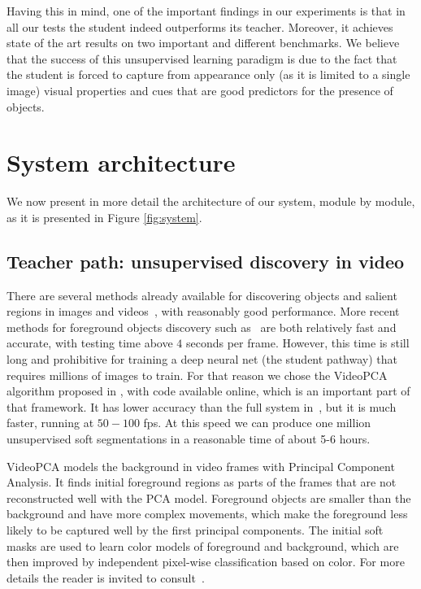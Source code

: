 \documentclass[10pt,twocolumn,letterpaper]{article}
\begin{document}
Having this in mind, one of the important findings in our experiments is that in all our tests
the student indeed outperforms its teacher. Moreover, it achieves state of the art results on two important and different benchmarks. We believe that the success of this unsupervised learning paradigm is due to the fact that the student is forced to capture from appearance only (as it is limited to a single image) visual properties and cues that are good predictors for the presence of objects.

\section{System architecture}

We now present in more detail the architecture of our system, module by module, as it is presented in Figure \ref{fig:system}.

\subsection{Teacher path: unsupervised discovery in video}

There are several methods already
available for discovering objects and salient regions in images and videos~\cite{borji2012salient,cheng2015global,hou2007saliency, jiang2013salient,cucchiara2003detecting,barnich2011vibe},
with reasonably good performance. More recent methods for foreground objects discovery such as~\cite{papazoglou2013fast,stretcu2015multiple} are both relatively fast and accurate, with testing time above $4$ seconds per frame. However, this time is still long and prohibitive for training a deep neural net (the student pathway) that requires millions of images to train. For that reason we chose the VideoPCA algorithm proposed in \cite{stretcu2015multiple}, with code available online, which is an important part of that 
framework. It has lower accuracy than the full system in~\cite{stretcu2015multiple}, but it is much faster, running at $50-100$ fps. At this speed we can produce one million unsupervised soft segmentations in a reasonable time of about 5-6 hours.

VideoPCA models the background in video frames with Principal Component Analysis. It finds initial foreground regions as parts of the frames that are not reconstructed well
with the PCA model. Foreground objects are smaller than the background and
have more complex movements, which make the foreground less likely to be captured well
by the first principal components. The initial soft masks  are used to learn color models of foreground and background, which are then improved by independent pixel-wise classification based on color. For more details the reader is invited to consult~\cite{stretcu2015multiple}.
\end{document}
